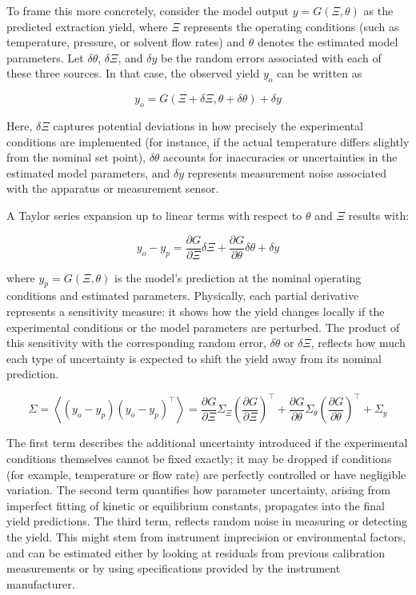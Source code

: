 \documentclass[../Article_Design_of_Experiment.tex]{subfiles}
\begin{document}
	To frame this more concretely, consider the model output $y=G(\Xi, \theta)$ as the predicted extraction yield, where $\Xi$ represents the operating conditions (such as temperature, pressure, or solvent flow rates) and $\theta$ denotes the estimated model parameters. Let $\delta \theta$, $\delta \Xi$, and $\delta y$ be the random errors associated with each of these three sources. In that case, the observed yield $y_o$ can be written as
	
	{\footnotesize \begin{equation} y_o = G(\Xi + \delta \Xi, \theta + \delta \theta) + \delta y \end{equation} }
	
	Here, $\delta \Xi$ captures potential deviations in how precisely the experimental conditions are implemented (for instance, if the actual temperature differs slightly from the nominal set point), $\delta \theta$ accounts for inaccuracies or uncertainties in the estimated model parameters, and $\delta y$ represents measurement noise associated with the apparatus or measurement sensor.
	
	A Taylor series expansion up to linear terms with respect to $\theta$ and $\Xi$ results with:
	
	{\footnotesize \begin{equation} y_o - y_p = \frac{\partial G}{\partial \Xi} \delta \Xi + \frac{\partial G}{\partial \theta} \delta \theta + \delta y \end{equation} }
	
	where $y_p=G(\Xi, \theta)$ is the model’s prediction at the nominal operating conditions and estimated parameters. Physically, each partial derivative represents a sensitivity measure: it shows how the yield changes locally if the experimental conditions or the model parameters are perturbed. The product of this sensitivity with the corresponding random error, $\delta \theta$ or $\delta \Xi$, reflects how much each type of uncertainty is expected to shift the yield away from its nominal prediction. 
	
	{\footnotesize \begin{equation} \Sigma = \left\langle (y_o - y_p)(y_o - y_p)^\top \right\rangle = \frac{\partial G}{\partial \Xi} \Sigma_\Xi \left( \frac{\partial G}{\partial \Xi} \right)^\top + \frac{\partial G}{\partial \theta} \Sigma_\theta \left( \frac{\partial G}{\partial \theta} \right)^\top + \Sigma_y \end{equation} }
	
	The first term describes the additional uncertainty introduced if the experimental conditions themselves cannot be fixed exactly; it may be dropped if conditions (for example, temperature or flow rate) are perfectly controlled or have negligible variation. The second term quantifies how parameter uncertainty, arising from imperfect fitting of kinetic or equilibrium constants, propagates into the final yield predictions. The third term, reflects random noise in measuring or detecting the yield. This might stem from instrument imprecision or environmental factors, and can be estimated either by looking at residuals from previous calibration measurements or by using specifications provided by the instrument manufacturer.
	
\end{document}
